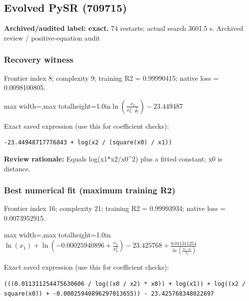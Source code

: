 \documentclass[10pt,letterpaper,landscape]{article}
\begin{document}
\begin{minipage}[t]{0.485\textwidth}
\subsection*{Evolved PySR (709715)}
\textbf{Archived/audited label: exact.} 74 restarts; actual search 3601.5 s.
{\small Archived review / positive-equation audit}
\subsubsection*{Recovery witness}
Frontier index 8; complexity 9; training R2 = 0.99990415; native loss = 0.0098100805.
\begin{center}\begin{adjustbox}{max width=\linewidth,max totalheight=1.0in}$\displaystyle \ln{\left(\frac{x_{2}}{x_{0}^{2} \cdot \frac{1}{x_{1}}} \right)} - 23.449487$\end{adjustbox}\end{center}
{\scriptsize Exact saved expression (use this for coefficient checks):}
\begin{lstlisting}
-23.44948717776843 + log(x2 / (square(x0) / x1))
\end{lstlisting}
{\small\textbf{Review rationale:} Equals log(x1*x2/x0\textasciicircum{}2) plus a fitted constant; x0 is distance.}
\subsubsection*{Best numerical fit (maximum training R2)}
Frontier index 16; complexity 21; training R2 = 0.99993934; native loss = 0.0073952915.
\begin{center}\begin{adjustbox}{max width=\linewidth,max totalheight=1.0in}$\displaystyle \ln{\left(x_{1} \right)} + \ln{\left(-0.00025940896 + \frac{x_{2}}{x_{0}^{2}} \right)} - 23.425768 + \frac{0.011311254}{\ln{\left(\frac{x_{0} \cdot x_{0}}{x_{2}} \right)}}$\end{adjustbox}\end{center}
{\scriptsize Exact saved expression (use this for coefficient checks):}
\begin{lstlisting}
(((0.011311254475630606 / log((x0 / x2) * x0)) + log(x1)) + log((x2 / square(x0)) + -0.00025940896297013655)) - 23.425768348022697
\end{lstlisting}
\end{minipage}
\clearpage{}\label{newton-10004}
\end{document}
